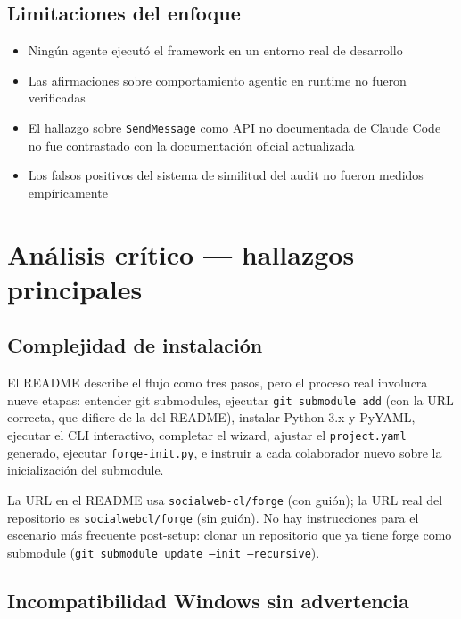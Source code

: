 \documentclass[11pt,a4paper]{article}
\begin{document}
\subsection*{Limitaciones del enfoque}

\begin{itemize}[leftmargin=1.5em]
  \item Ningún agente ejecutó el framework en un entorno real de desarrollo
  \item Las afirmaciones sobre comportamiento agentic en runtime no fueron verificadas
  \item El hallazgo sobre \texttt{SendMessage} como API no documentada de Claude Code no fue contrastado con la documentación oficial actualizada
  \item Los falsos positivos del sistema de similitud del audit no fueron medidos empíricamente
\end{itemize}

\section{Análisis crítico — hallazgos principales}

\subsection{Complejidad de instalación}

El README describe el flujo como tres pasos, pero el proceso real involucra nueve etapas: entender git submodules, ejecutar \texttt{git submodule add} (con la URL correcta, que difiere de la del README), instalar Python 3.x y PyYAML, ejecutar el CLI interactivo, completar el wizard, ajustar el \texttt{project.yaml} generado, ejecutar \texttt{forge-init.py}, e instruir a cada colaborador nuevo sobre la inicialización del submodule.

La URL en el README usa \texttt{socialweb-cl/forge} (con guión); la URL real del repositorio es \texttt{socialwebcl/forge} (sin guión). No hay instrucciones para el escenario más frecuente post-setup: clonar un repositorio que ya tiene forge como submodule (\texttt{git submodule update --init --recursive}).

\subsection{Incompatibilidad Windows sin advertencia}
\end{document}
